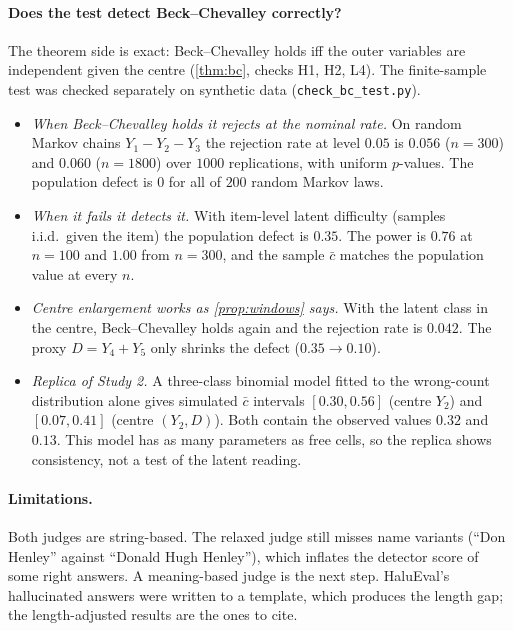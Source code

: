 \documentclass[11pt]{article}
\theoremstyle{definition}
\begin{document}
\paragraph{Does the test detect Beck--Chevalley correctly?} The theorem side is exact: Beck--Chevalley holds iff the outer variables are
independent given the centre (\cref{thm:bc}, checks H1, H2, L4). The finite-sample test was checked separately on synthetic data
(\texttt{check\_bc\_test.py}).
\begin{itemize}
\item \emph{When Beck--Chevalley holds it rejects at the nominal rate.} On random Markov chains $Y_1-Y_2-Y_3$ the rejection rate at
  level $0.05$ is $0.056$ ($n=300$) and $0.060$ ($n=1800$) over $1000$ replications, with uniform $p$-values. The population defect is
  $0$ for all of $200$ random Markov laws.
\item \emph{When it fails it detects it.} With item-level latent difficulty (samples i.i.d.\ given the item) the population defect is
  $0.35$. The power is $0.76$ at $n=100$ and $1.00$ from $n=300$, and the sample $\bar c$ matches the population value at every $n$.
\item \emph{Centre enlargement works as \cref{prop:windows} says.} With the latent class in the centre, Beck--Chevalley holds again and
  the rejection rate is $0.042$. The proxy $D=Y_4+Y_5$ only shrinks the defect ($0.35\to0.10$).
\item \emph{Replica of Study 2.} A three-class binomial model fitted to the wrong-count distribution alone gives simulated $\bar c$
  intervals $[0.30,0.56]$ (centre $Y_2$) and $[0.07,0.41]$ (centre $(Y_2,D)$). Both contain the observed values $0.32$ and $0.13$. This
  model has as many parameters as free cells, so the replica shows consistency, not a test of the latent reading.
\end{itemize}

\paragraph{Limitations.} Both judges are string-based. The relaxed judge still misses name variants (``Don Henley'' against ``Donald
Hugh Henley''), which inflates the detector score of some right answers. A meaning-based judge is the next step. HaluEval's
hallucinated answers were written to a template, which produces the length gap; the length-adjusted results are the ones to cite.
\end{document}
